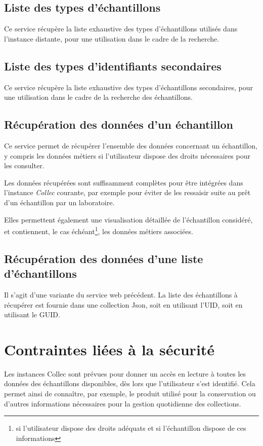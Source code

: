 \subsection{Liste des types d'échantillons}
Ce service récupère la liste exhaustive des types d'échantillons utilisés dans l'instance distante, pour une utilisation dans le cadre de la recherche.

\subsection{Liste des types d'identifiants secondaires}
Ce service récupère la liste exhaustive des types d'échantillons secondaires, pour une utilisation dans le cadre de la recherche des échantillons.

\subsection{Récupération des données d'un échantillon}
Ce service permet de récupérer l'ensemble des données concernant un échan\-tillon, y compris les données \og métiers \fg{} si l'utilisateur dispose des droits néces\-saires pour les consulter.

Les données récupérées sont suffisamment complètes pour être intégrées dans l'instance \textit{Collec} courante, par exemple pour éviter de les ressaisir suite au prêt d'un échantillon par un laboratoire.

Elles permettent également une visualisation détaillée de l'échantillon consi\-déré, et contiennent, le cas échéant\footnote{si l'utilisateur dispose des droits adéquats et si l'échantillon dispose de ces informations}, les données \og métiers \fg{} associées.

\subsection{Récupération des données d'une liste d'échantillons}

Il s'agit d'une variante du service web précédent. La liste des échantillons à récupérer est fournie dans une collection Json, soit en utilisant l'UID, soit en utilisant le GUID.

\section{Contraintes liées à la sécurité}

Les instances Collec sont prévues pour donner un accès en lecture à toutes les données des échantillons disponibles, dès lors que l'utilisateur s'est identifié. Cela permet ainsi de connaître, par exemple, le produit utilisé pour la conservation ou d'autres informations nécessaires pour la gestion quotidienne des collections.

